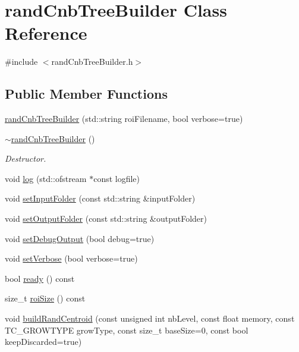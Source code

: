 \hypertarget{classrandCnbTreeBuilder}{\section{rand\-Cnb\-Tree\-Builder \-Class \-Reference}
\label{classrandCnbTreeBuilder}
}


{\ttfamily \#include $<$rand\-Cnb\-Tree\-Builder.\-h$>$}

\subsection*{\-Public \-Member \-Functions}
\begin{DoxyCompactItemize}
\item 
\hyperlink{classrandCnbTreeBuilder_ae28358f042516f8e1f519352161b6be9}{rand\-Cnb\-Tree\-Builder} (std\-::string roi\-Filename, bool verbose=true)
\item 
\hypertarget{classrandCnbTreeBuilder_a22f0722e5f294923ae61483c363ebab8}{\hyperlink{classrandCnbTreeBuilder_a22f0722e5f294923ae61483c363ebab8}{$\sim$rand\-Cnb\-Tree\-Builder} ()}\label{classrandCnbTreeBuilder_a22f0722e5f294923ae61483c363ebab8}

\begin{DoxyCompactList}\small\item\em \-Destructor. \end{DoxyCompactList}\item 
void \hyperlink{classrandCnbTreeBuilder_a3d57d93476df8a8e8f9a89fe07173353}{log} (std\-::ofstream $\ast$const logfile)
\item 
void \hyperlink{classrandCnbTreeBuilder_a5e01f648c52cb330c40d4b69d941d6a3}{set\-Input\-Folder} (const std\-::string \&input\-Folder)
\item 
void \hyperlink{classrandCnbTreeBuilder_ad7d21f2b66123a5cf187345263bf18a6}{set\-Output\-Folder} (const std\-::string \&output\-Folder)
\item 
void \hyperlink{classrandCnbTreeBuilder_a2b4fd48507c87d76438b9af4dde545af}{set\-Debug\-Output} (bool debug=true)
\item 
void \hyperlink{classrandCnbTreeBuilder_a5b800b8ed740702d521f069d665d327e}{set\-Verbose} (bool verbose=true)
\item 
bool \hyperlink{classrandCnbTreeBuilder_a3a280b2c2a28f1d17c1342237b4a49f6}{ready} () const 
\item 
size\-\_\-t \hyperlink{classrandCnbTreeBuilder_aaca3f503cc051278fea5b815d496df6f}{roi\-Size} () const 
\item 
void \hyperlink{classrandCnbTreeBuilder_a70e15a6a36eb373ef0a184586e49ede3}{build\-Rand\-Centroid} (const unsigned int nb\-Level, const float memory, const \-T\-C\-\_\-\-G\-R\-O\-W\-T\-Y\-P\-E grow\-Type, const size\-\_\-t base\-Size=0, const bool keep\-Discarded=true)
\end{DoxyCompactItemize}


